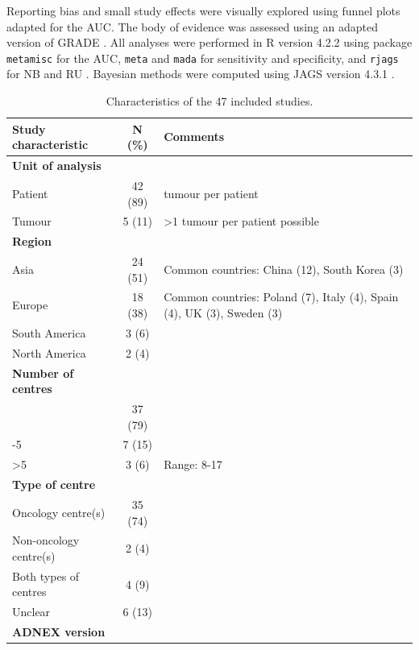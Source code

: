 Reporting bias and small study effects were visually explored using funnel plots
adapted for the \gls{AUC}. The body of evidence was assessed using an adapted version
of \gls{GRADE} \cite{guyattGRADEEmergingConsensus2008}. All analyses were performed in
R version 4.2.2 using package \texttt{metamisc} for the \gls{AUC}, \texttt{meta} and \texttt{mada} for
sensitivity and specificity, and \texttt{rjags} for \gls{NB} and \gls{RU}
 \cite{debrayFrameworkMetaanalysisPrediction2019,
schwarzerMetaAnalysis2015,
doeblerMetaanalysisDiagnosticAccuracy2025,
plummerRjagsBayesianGraphical2023}.
Bayesian methods were computed using \gls{JAGS} version 4.3.1
 \cite{plummerRjagsBayesianGraphical2023}.

 \begin{table}[h!]
\small
\centering
\caption{Characteristics of the 47 included studies.}
\label{tab:1}
\begin{tabularx}{\linewidth}{l c >{\raggedright\arraybackslash}X}
\toprule
\textbf{Study characteristic} & \textbf{N (\%)} & \textbf{Comments} \\ 
\midrule
\textbf{Unit of analysis} & & \\
\quad Patient & 42 (89) & 1 tumour per patient \\
\quad Tumour & 5 (11) & >1 tumour per patient possible \\
\addlinespace
\textbf{Region} & & \\
\quad Asia & 24 (51) & Common countries: China (12), South Korea (3) \\
\quad Europe & 18 (38) & Common countries: Poland (7), Italy (4), Spain (4), UK (3), Sweden (3) \\
\quad South America & 3 (6) & \\
\quad North America & 2 (4) & \\
\addlinespace
\textbf{Number of centres} & & \\
\quad 1 & 37 (79) & \\
\quad 2-5 & 7 (15) & \\
\quad >5 & 3 (6) & Range: 8-17 \\
\addlinespace
\textbf{Type of centre} & & \\
\quad Oncology centre(s) & 35 (74) & \\
\quad Non-oncology centre(s) & 2 (4) & \\
\quad Both types of centres & 4 (9) & \\
\quad Unclear & 6 (13) & \\
\addlinespace
\textbf{ADNEX version} & & \\

\end{tabularx}
\end{table}
